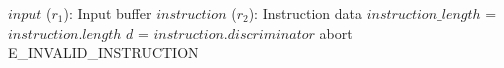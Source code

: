 \begin{algorithm}
\caption{Entrypoint}
\begin{algorithmic}
\INPUT $input$ ($r_1$): Input buffer
\INPUT $instruction$ ($r_2$): Instruction data
\STATE $instruction\_length$ = $instruction.length$
\STATE $d$ = $instruction.discriminator$
\STATE {}
\ENDIF
\STATE abort E\_INVALID\_INSTRUCTION
\ENDPROCEDURE
\end{algorithmic}
\end{algorithm}
